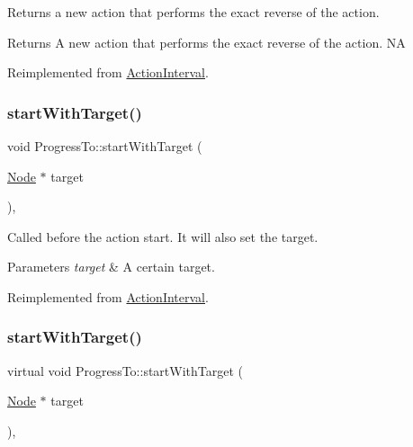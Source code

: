 Returns a new action that performs the exact reverse of the action.

\begin{DoxyReturn}{Returns}
A new action that performs the exact reverse of the action.  NA 
\end{DoxyReturn}


Reimplemented from \hyperlink{classActionInterval_a9f9ac7164036a0bc261a72f62a2b2da7}{Action\+Interval}.

\mbox{\label{classProgressTo_a9533f1dab48b9243b170f463b8498f07}} 
\subsubsection{\texorpdfstring{start\+With\+Target()}{startWithTarget()}\hspace{0.1cm}{\footnotesize\ttfamily [1/2]}}
{\footnotesize\ttfamily void Progress\+To\+::start\+With\+Target (\begin{DoxyParamCaption}\item[{\hyperlink{classNode}{Node} $\ast$}]{target }\end{DoxyParamCaption})\hspace{0.3cm}{\ttfamily [override]}, {\ttfamily [virtual]}}

Called before the action start. It will also set the target.


\begin{DoxyParams}{Parameters}
{\em target} & A certain target. \\
\hline
\end{DoxyParams}


Reimplemented from \hyperlink{classActionInterval_ad3d91186b2c3108488ddbbdbbd982484}{Action\+Interval}.

\mbox{\label{classProgressTo_ac32af7881cffffec6eb7dcfcb0a18c6b}} 
\subsubsection{\texorpdfstring{start\+With\+Target()}{startWithTarget()}\hspace{0.1cm}{\footnotesize\ttfamily [2/2]}}
{\footnotesize\ttfamily virtual void Progress\+To\+::start\+With\+Target (\begin{DoxyParamCaption}\item[{\hyperlink{classNode}{Node} $\ast$}]{target }\end{DoxyParamCaption})\hspace{0.3cm}{\ttfamily [override]}, {\ttfamily [virtual]}}

